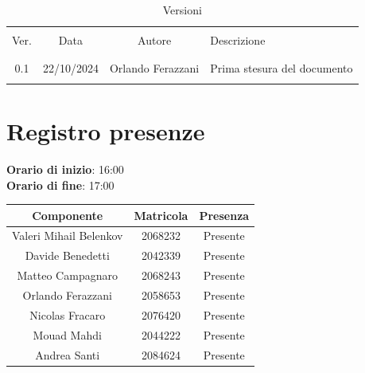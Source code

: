 \documentclass[italian, 12pt]{article}
\begin{document}
\pagestyle{mystyle}


\begin{table}[!h]
	\caption{Versioni}
	\begin{center}
		\begin{tabular}{ c c c p{9cm}}
			\hline \\[-2ex]
			Ver. & Data & Autore & Descrizione \\
			\\[-2ex] \hline \\[-1.5ex]
			0.1 & 22/10/2024 & Orlando Ferazzani& Prima stesura del documento\\
			\\[-1.5ex] \hline
		\end{tabular}
	\end{center}
\end{table}


\tableofcontents
\newpage


\section{Registro presenze}

\textbf{Orario di inizio}: 16:00\\
\textbf{Orario di fine}: 17:00\\


\begin{flushleft}
	\begin{table}[!h]
	\begin{tabular}{ |c|c|c| } 
		\hline
		\textbf{Componente} & \textbf{Matricola} & \textbf{Presenza} \\
  \hline 
		Valeri Mihail Belenkov & 2068232 & Presente \\
		Davide Benedetti 	& 2042339 & Presente \\
		Matteo Campagnaro	& 2068243 & Presente \\
		Orlando Ferazzani 	& 2058653 & Presente \\
		Nicolas Fracaro 	& 2076420 & Presente \\
		Mouad Mahdi		    & 2044222 & Presente \\ 
		Andrea Santi 	    & 2084624 & Presente \\
		\hline
	\end{tabular}
	\end{table}
	\end{flushleft}
\end{document}
